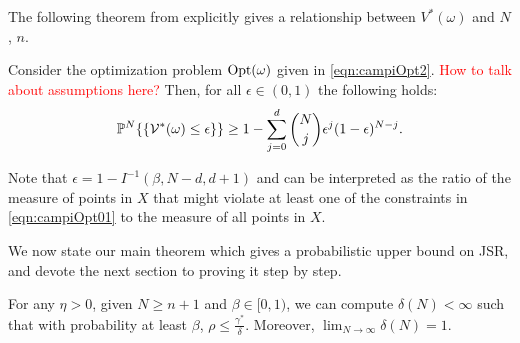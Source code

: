 
The following theorem from \cite{campi} explicitly gives a relationship between $V^*(\omega)$ and $N$, $n$.
\begin{theorem}\label{thm:campi}Consider the optimization problem $\text{Opt}(\omega)$ given in \eqref{eqn:campiOpt2}. \textcolor{red}{How to talk about assumptions here?} Then, for all $\epsilon \in (0,1)$ the following holds:
\begin{equation*}\mathbb{P}^N\{\{\mathcal{V}^*(\omega) \leq \epsilon\} \} \geq 1- \sum_{j=0}^{d} \binom{N}{j}\epsilon^j (1-\epsilon)^{N-j}.\end{equation*}
\end{theorem}

Note that $\epsilon=1-I^{-1}(\beta, N-d, d+1)$ and can be interpreted as the ratio of the measure of points in $X$ that might violate at least one of the constraints in \eqref{eqn:campiOpt01} to the measure of all points in $X$.

We now state our main theorem which gives a probabilistic upper bound on JSR, and devote the next section to proving it step by step.

\begin{theorem} \label{thm:mainTheorem} For any $\eta > 0$, given $N \geq n+1$ and $\beta \in [0,1)$, we can compute $\delta(N) < \infty$ such that with probability at least $\beta$, $\rho \leq \frac{\gamma^*}{\delta}$. Moreover, $\lim_{N \to \infty} \delta(N) = 1$.
\end{theorem}